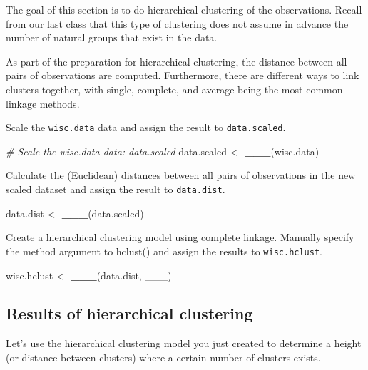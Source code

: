 \documentclass[]{article}
\newenvironment{Shaded}{\begin{snugshade}}{\end{snugshade}}
\newcommand{\KeywordTok}[1]{\textcolor[rgb]{0.13,0.29,0.53}{\textbf{#1}}}
\newcommand{\StringTok}[1]{\textcolor[rgb]{0.31,0.60,0.02}{#1}}
\newcommand{\CommentTok}[1]{\textcolor[rgb]{0.56,0.35,0.01}{\textit{#1}}}
\newcommand{\NormalTok}[1]{#1}
\begin{document}
The goal of this section is to do hierarchical clustering of the
observations. Recall from our last class that this type of clustering
does not assume in advance the number of natural groups that exist in
the data.

As part of the preparation for hierarchical clustering, the distance
between all pairs of observations are computed. Furthermore, there are
different ways to link clusters together, with single, complete, and
average being the most common linkage methods.

Scale the \texttt{wisc.data} data and assign the result to
\texttt{data.scaled}.

\begin{Shaded}
\begin{Highlighting}[]
\CommentTok{# Scale the wisc.data data: data.scaled}
\NormalTok{data.scaled <-}\StringTok{ }\KeywordTok{___}\NormalTok{(wisc.data)}
\end{Highlighting}
\end{Shaded}

Calculate the (Euclidean) distances between all pairs of observations in
the new scaled dataset and assign the result to \texttt{data.dist}.

\begin{Shaded}
\begin{Highlighting}[]
\NormalTok{data.dist <-}\StringTok{ }\KeywordTok{___}\NormalTok{(data.scaled)}
\end{Highlighting}
\end{Shaded}

Create a hierarchical clustering model using complete linkage. Manually
specify the method argument to hclust() and assign the results to
\texttt{wisc.hclust}.

\begin{Shaded}
\begin{Highlighting}[]
\NormalTok{wisc.hclust <-}\StringTok{ }\KeywordTok{___}\NormalTok{(data.dist, ___)}
\end{Highlighting}
\end{Shaded}

\subsection{Results of hierarchical
clustering}\label{results-of-hierarchical-clustering}

Let's use the hierarchical clustering model you just created to
determine a height (or distance between clusters) where a certain number
of clusters exists.
\end{document}
